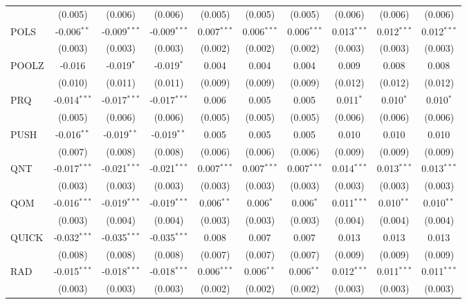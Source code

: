 \begin{table}[!htbp]
\begin{tabular}{@{\extracolsep{5pt}}lccccccccc}
  & (0.005) & (0.006) & (0.006) & (0.005) & (0.005) & (0.005) & (0.006) & (0.006) & (0.006) \\
 POLS & -0.006$^{**}$ & -0.009$^{***}$ & -0.009$^{***}$ & 0.007$^{***}$ & 0.006$^{***}$ & 0.006$^{***}$ & 0.013$^{***}$ & 0.012$^{***}$ & 0.012$^{***}$ \\
  & (0.003) & (0.003) & (0.003) & (0.002) & (0.002) & (0.002) & (0.003) & (0.003) & (0.003) \\
 POOLZ & -0.016$^{}$ & -0.019$^{*}$ & -0.019$^{*}$ & 0.004$^{}$ & 0.004$^{}$ & 0.004$^{}$ & 0.009$^{}$ & 0.008$^{}$ & 0.008$^{}$ \\
  & (0.010) & (0.011) & (0.011) & (0.009) & (0.009) & (0.009) & (0.012) & (0.012) & (0.012) \\
 PRQ & -0.014$^{***}$ & -0.017$^{***}$ & -0.017$^{***}$ & 0.006$^{}$ & 0.005$^{}$ & 0.005$^{}$ & 0.011$^{*}$ & 0.010$^{*}$ & 0.010$^{*}$ \\
  & (0.005) & (0.006) & (0.006) & (0.005) & (0.005) & (0.005) & (0.006) & (0.006) & (0.006) \\
 PUSH & -0.016$^{**}$ & -0.019$^{**}$ & -0.019$^{**}$ & 0.005$^{}$ & 0.005$^{}$ & 0.005$^{}$ & 0.010$^{}$ & 0.010$^{}$ & 0.010$^{}$ \\
  & (0.007) & (0.008) & (0.008) & (0.006) & (0.006) & (0.006) & (0.009) & (0.009) & (0.009) \\
 QNT & -0.017$^{***}$ & -0.021$^{***}$ & -0.021$^{***}$ & 0.007$^{***}$ & 0.007$^{***}$ & 0.007$^{***}$ & 0.014$^{***}$ & 0.013$^{***}$ & 0.013$^{***}$ \\
  & (0.003) & (0.003) & (0.003) & (0.003) & (0.003) & (0.003) & (0.003) & (0.003) & (0.003) \\
 QOM & -0.016$^{***}$ & -0.019$^{***}$ & -0.019$^{***}$ & 0.006$^{**}$ & 0.006$^{*}$ & 0.006$^{*}$ & 0.011$^{***}$ & 0.010$^{**}$ & 0.010$^{**}$ \\
  & (0.003) & (0.004) & (0.004) & (0.003) & (0.003) & (0.003) & (0.004) & (0.004) & (0.004) \\
 QUICK & -0.032$^{***}$ & -0.035$^{***}$ & -0.035$^{***}$ & 0.008$^{}$ & 0.007$^{}$ & 0.007$^{}$ & 0.013$^{}$ & 0.013$^{}$ & 0.013$^{}$ \\
  & (0.008) & (0.008) & (0.008) & (0.007) & (0.007) & (0.007) & (0.009) & (0.009) & (0.009) \\
 RAD & -0.015$^{***}$ & -0.018$^{***}$ & -0.018$^{***}$ & 0.006$^{***}$ & 0.006$^{**}$ & 0.006$^{**}$ & 0.012$^{***}$ & 0.011$^{***}$ & 0.011$^{***}$ \\
  & (0.003) & (0.003) & (0.003) & (0.002) & (0.002) & (0.002) & (0.003) & (0.003) & (0.003) \\

\end{tabular}
\end{table}
